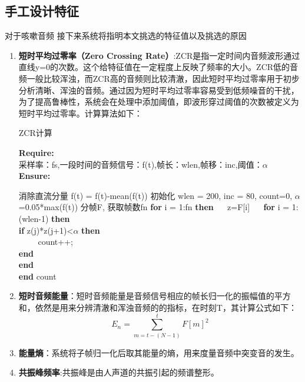 \subsection{手工设计特征}
对于咳嗽音频
接下来系统将指明本文挑选的特征值以及挑选的原因
\begin{enumerate}
    \item \textbf{短时平均过零率（Zero Crossing Rate）}:ZCR是指一定时间内音频波形通过直线y=0的次数。这个给特征值在一定程度上反映了频率的大小。ZCR低的音频一般比较浑浊，而ZCR高的音频则比较清澈，因此短时平均过零率用于初步分析清晰、浑浊的音频。通过因为短时平均过零率容易受到低频噪音的干扰，为了提高鲁棒性，系统会在处理中添加阈值，即波形穿过阈值的次数被定义为短时平均过零率。计算算法如下：
\begin{algorithm}[h]
    \caption{ ZCR计算} %
    \hspace*{0.02in} {\bf Require:}\\%
    采样率：fs,一段时间的音频信号：f(t),帧长：wlen,帧移：inc,阈值：\(\alpha\)\\
    \hspace*{0.02in} {\bf Ensure:} %
    \begin{algorithmic}[1]
    \State 消除直流分量  f(t) = f(t)-mean(f(t)) %
    \State 初始化 wlen = 200, inc = 80, count=0, \(\alpha\)=0.05*max(f(t))
    \State 分帧F, 获取帧数fn
    \State \textbf{for} i = 1:fn \textbf{then}
    　 \State z=F[i]
    　 \State \textbf{for} i = 1:(wlen-1) \textbf{then}\\
                \textbf{if} z(j)*z(j+1)<\(\alpha\) \textbf{then}\\
        　　          count++;\\
        \textbf{end}\\
        \textbf{end}\\
    \textbf{end}
    \State \Return count
    \end{algorithmic}
\end{algorithm}
    \item \textbf{短时音频能量}：短时音频能量是音频信号相应的帧长归一化的振幅值的平方和，依然是用来分辨清澈和浑浊音频的的指标，在时刻T，其计算公式如下：
    \begin{equation}
        E_n = \sum_{m=t-(N-1)}^{t} F[m]^2
    \end{equation}
    \item \textbf{能量熵}：系统将子帧归一化后取其能量的熵，用来度量音频中突变音的发生。
    \item \textbf{共振峰频率}:共振峰是由人声道的共振引起的频谱整形。

\end{enumerate}
